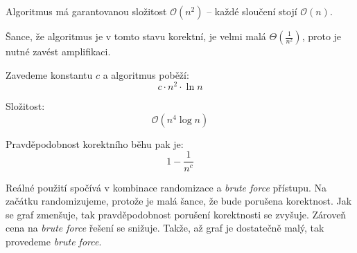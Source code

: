 \begin{compactitem}
    \item Algoritmus má garantovanou složitost $\mathcal{O}(n^2)$ -- každé sloučení stojí $\mathcal{O}(n)$.

    \item Šance, že algoritmus je v tomto stavu korektní, je velmi malá $\Theta(\frac{1}{n^2})$, proto je nutné zavést amplifikaci. \begin{compactitem}
        \item Zavedeme konstantu $c$ a algoritmus poběží:
        $$c \cdot n^2 \cdot \ln{n}$$
        \item Složitost:
        $$\mathcal{O}(n^4 \log{n})$$
        \item Pravděpodobnost korektního běhu pak je:
        $$1 - \frac{1}{n^c}$$
    \end{compactitem}

    \item Reálné použití spočívá v kombinace randomizace a \textit{brute force} přístupu. Na začátku randomizujeme, protože je malá šance, že bude porušena korektnost. Jak se graf zmenšuje, tak pravděpodobnost porušení korektnosti se zvyšuje. Zároveň cena na \textit{brute force} řešení se snižuje. Takže, až graf je dostatečně malý, tak provedeme \textit{brute force}.
\end{compactitem}
